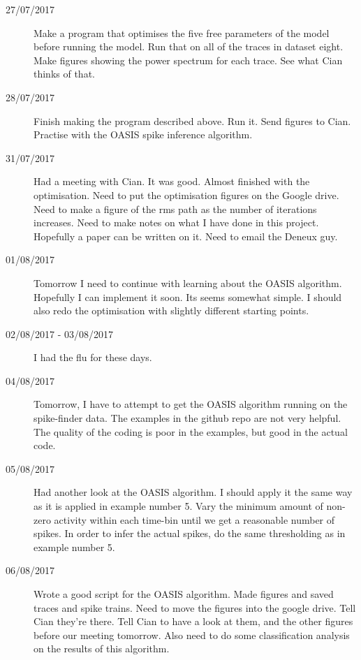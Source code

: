 \documentclass[a4paper,12pt]{article}
\theoremstyle{definition}
\begin{document}
\begin{description}
	\item[27/07/2017] Make a program that optimises the five free parameters of the model before running the model. Run that on all of the traces in dataset eight. Make figures showing the power spectrum for each trace. See what Cian thinks of that.

	\item[28/07/2017] Finish making the program described above. Run it. Send figures to Cian. Practise with the OASIS spike inference algorithm.

	\item[31/07/2017] Had a meeting with Cian. It was good. Almost finished with the optimisation. Need to put the optimisation figures on the Google drive. Need to make a figure of the rms path as the number of iterations increases. Need to make notes on what I have done in this project. Hopefully a paper can be written on it. Need to email the Deneux guy.

	\item[01/08/2017] Tomorrow I need to continue with learning about the OASIS algorithm. \\ Hopefully I can implement it soon. Its seems somewhat simple. I should also redo the optimisation with slightly different starting points.

	\item[02/08/2017 - 03/08/2017] I had the flu for these days.

	\item[04/08/2017] Tomorrow, I have to attempt to get the OASIS algorithm running on the spike-finder data. The examples in the github repo are not very helpful. The quality of the coding is poor in the examples, but good in the actual code.

	\item[05/08/2017] Had another look at the OASIS algorithm. I should apply it the same way as it is applied in example number 5. Vary the minimum amount of non-zero activity within each time-bin until we get a reasonable number of spikes. In order to infer the actual spikes, do the same thresholding as in example number 5.

	\item[06/08/2017] Wrote a good script for the OASIS algorithm. Made figures and saved traces and spike trains. Need to move the figures into the google drive. Tell Cian they're there. Tell Cian to have a look at them, and the other figures before our meeting tomorrow. Also need to do some classification analysis on the results of this algorithm.


\end{description}
\end{document}
